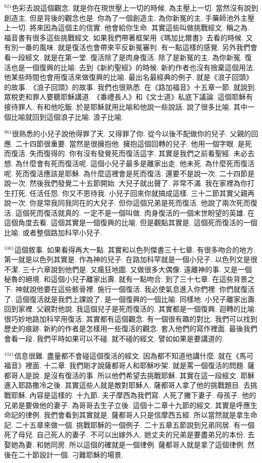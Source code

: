 \documentclass{book}
\begin{document}
$^{921}$色彩去說這個觀念.
就是你在現世壓上一切的時候.
為主壓上一切.
當然沒有說到創造主.
但是背後的觀念也是.
你為了一個創造主.
為你新冤的主.
手藥師池外主壓上一切.
將來因為這個主的信實.
他會給你生命.
其實這些叫做挑戰經文.
稱之為.
福音書有很多這些挑戰經文.
如果我們帶著框架用《瑪加比爾書》去看的時候.
又有別一番的風味.
就是復活也會帶來平反新冤審判.
有一點這樣的感覺.
另外我們會看一段經文.
就是在第一堂.
復活除了是肉身復活.
除了是新冤的主.
為你新冤.
復活也是一個復興的比喻.
去到《新約聖經》的時候.
新約作者也沒有捨棄這個用法.
他某些時間也會用復活來做復興的比喻.
最出名最經典的例子.
就是《浪子回頭》的故事.
《浪子回頭》的故事.
我們也很熟悉.
在《路加福音》十五章一節.
就說到.
眾稅吏和罪人要聽耶穌講道.
《番禮長人》和《文士道》私底下議論.
這個耶穌有接待罪人.
有和他吃飯.
於是耶穌就用比喻和他說一些說話.
說了很多比喻.
其中一個比喻就回到這個浪子比喻.
浪子比喻.

$^{961}$很熟悉的小兒子說他得罪了天.
又得罪了你.
從今以後不配做你的兒子.
父親的回應.
二十四節很重要.
當然是很擁抱他.
擁抱這個回轉的兒子.
他用一個字眼.
是死而復活.
失而復得的.
你有沒有發覺死而復活這字.
其實是我們之前看聖經.
未必去想.
為什麼會有死而復活呢.
這個小兒子最多是離家出走.
他未死.
為什麼死而復活呢.
死而復活應該是耶穌.
為什麼這裡會是死而復活.
還要不是說一次.
二十四節是說一次.
然後我們發覺二十五節開始.
大兒子就出聲了.
非常不滿.
我在家裡為你打生打死.
任活任怨.
你又不恩待我.
小兒子回來你就搞成這樣.
三十二節其實父親再說一次.
你是常我同我同在的大兒子.
但你這個兄弟是死而復活.
他說了兩次死而復活.
這個死而復活就真的.
一定不是一個叫做.
肉身復活的一個末世盼望的英雄.
在這個角度去看.
這個其實是一個復興的比喻.
但是觀點其實是.
這個死而復活的一個比喻.
或者整個路加科罕小兒子.

$^{1001}$這個敘事.
如果看得再大一點.
其實和以色列傑書三十七章.
有很多吻合的地方.
第一就是以色列其實是.
作為神的兒子.
在路加科罕就是一個小兒子.
以色列文是很不潔.
三十六章說到他們是.
又瘋狂地圖.
又做很多大偶像.
遠離神的事.
又是一個秘魯的絕境.
和這個小兒子離家出壽.
就有一點吻合.
到了三十七章.
在這些背景之下.
神就說他要在這些骸骨裡.
施行一個復活.
我必使氣息進入你們裡.
你們就復活了.
這個復活就是我們上課說了.
是一個復興的一個比喻.
同樣地.
小兒子離家出壽.
回到家裡.
父親對他說.
我這個兒子是死而復活的.
其實都是一個復興.
迴轉的比喻.
很巧妙地路加科罕用復活.
其實都有這個觀念.
有一個很有趣的對比.
我們可以找到歷史的痕跡.
新約的作者是怎樣用一些復活的觀念.
套入他們的寫作裡面.
最後我們會看一段.
我們平時如果可以不碰.
就不碰的經文.
譬如如果是要講道的.

$^{1041}$信息很難.
盡量都不會碰這個復活的經文.
因為都不知道他講什麼.
就在《馬可福音》裡面.
十二章.
我們剛才說薩都哥人和耶穌吵架.
就是罵一個復活的問題.
薩都哥人是說.
是沒有復活的事.
所以他們希望去挑戰耶穌.
其實在這一段經文.
耶穌進入耶路撒冷之後.
其實這些人就是敵對耶穌人.
薩都哥人拿了他的挑戰題目.
去挑戰耶穌.
內容是這樣的.
十九節.
夫子摩西為我們寫.
人死了撇下妻子.
母孩子.
他的兄弟是要做他的妻子.
為哥哥去生子立後.
這個十二章十九節的經文.
其實是呼應生命記的律例.
我們會看到其實就是.
薩都哥人只是信摩西五經.
所以當然就是拿生命記.
二十五章來做一個.
挑戰耶穌的一個例子.
二十五章五節說到兄弟同居.
有一個死了母兒.
自己死人的妻子.
不可以出嫁外人.
她丈夫的兄弟是要盡弟兄的本份.
去娶她為妻.
和她同房.
所以這個的確就是一個律例.
薩都哥人就是拿了這個律例.
然後在二十節設計一個.
刁難耶穌的場景.
\end{document}
